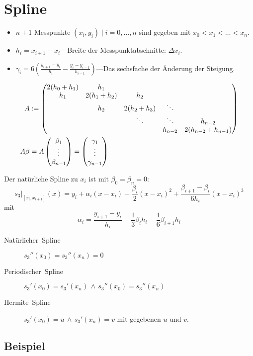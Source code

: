 

\section{Spline}
\begin{itemize}
  \item $n+1$ Messpunkte $(x_{i},y_{i})\mid i=0,\ldots,n$ sind gegeben mit $x_{0}<x_{1}<\ldots<x_{n}$.
  \item $h_{i}=x_{i+1}-x_{i}$---Breite der Messpunktabschnitte: $\Delta x_{i}$.
  \item $\gamma_{i}=6\left(\frac{y_{i+1}-y_{i}}{h_{i}}-\frac{y_{i}-y_{i-1}}{h_{i-1}}\right)$---Das sechsfache der Änderung der Steigung.
\end{itemize}
\begin{align*}
  A & :=\begin{pmatrix}
	2(h_0 + h_1) & h_1               \\
	h_1          & 2(h_1 + h_2) & h_2 \\
		    & h_2          & 2(h_2 + h_3) & \ddots \\
		    &              & \ddots       & \ddots & h_{n-2} \\
		    &              &              & h_{n-2} & 2(h_{n-2} + h_{n-1})
      \end{pmatrix}\\
  A \beta & = A \veccc(\beta_1;\vdots;\beta_{n-1}) = \veccc(\gamma_1;\vdots;\gamma_{n-1})
\end{align*}


Der natürliche Spline zu $x_i$ ist mit $\beta_{0}=\beta_{n}=0$:
\[ \left.s_3\right|_{[x_i, x_{i+1}]}(x) = y_i + \alpha_i(x-x_i) + \frac{\beta_i}{2}(x-x_i)^2 + \frac{\beta_{i+1}-\beta_i}{6h_i}(x-x_i)^3 \]
mit
\[ \alpha_i = \frac{y_{i+1}-y_i}{h_i} - \frac{1}{3}\beta_i h_i - \frac{1}{6}\beta_{i+1}h_i \]

\begin{description}
  \item [{Natürlicher~Spline}]
	$s_{3}''(x_0) = s_{3}''(x_n)=0$
  \item [{Periodischer~Spline}]
	$s_{3}'(x_0) = s_{3}'(x_n) \, \land \, s_{3}''(x_0) = s_{3}''(x_n)$
  \item [{Hermite~Spline}]
	$s_{3}'(x_0) = u \, \land \, s_{3}'(x_n)=v$ mit gegebenen $u$ und $v$.
\end{description}

\subsection{Beispiel}

